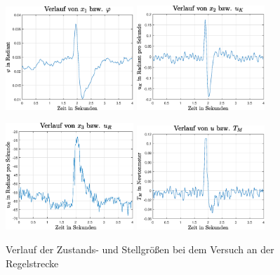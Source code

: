 \begin{figure}[h!]
\centering
\includegraphics[width=0.43\textwidth]{img/edge_exp1_phi.eps}\hspace{0.7cm}
\includegraphics[width=0.43\textwidth]{img/edge_exp1_uk.eps}
\vspace{0.3cm}

\includegraphics[width=0.43\textwidth]{img/edge_exp1_ur.eps}\hspace{0.7cm}
\includegraphics[width=0.43\textwidth]{img/edge_exp1_tm.eps}\caption{Verlauf der Zustands- und Stellgrößen bei dem Versuch an der Regelstrecke}
\end{figure}
\pagebreak

